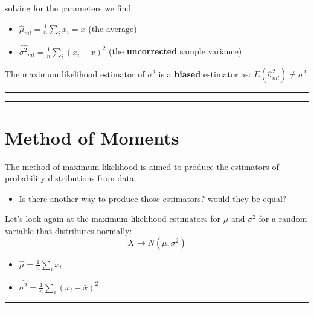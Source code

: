 \documentclass[
]{book}
\providecommand{\tightlist}{%
  \setlength{\itemsep}{0pt}\setlength{\parskip}{0pt}}
\begin{document}
solving for the parameters we find

\begin{itemize}
\tightlist
\item
  \(\hat{\mu}_{ml}=\frac{1}{n}\sum_i x_i=\bar{x}\) (the average)
\item
  \(\hat{\sigma^2}_{ml}=\frac{1}{n}\sum_i(x_i-\bar{x})^2\) (the \textbf{uncorrected} sample variance)
\end{itemize}

The maximum likelihood estimator of \(\sigma^2\) is a \textbf{biased} estimator as: \(E(\hat{\sigma}^2_{ml})\neq \sigma^2\)

\begin{center}\rule{0.5\linewidth}{0.5pt}\end{center}

\begin{center}\rule{0.5\linewidth}{0.5pt}\end{center}

\hypertarget{method-of-moments}{%
\section{Method of Moments}\label{method-of-moments}}

The method of maximum likelihood is aimed to produce the estimators of probability distributions from data.

\begin{itemize}
\tightlist
\item
  Is there another way to produce those estimators? would they be equal?
\end{itemize}

Let's look again at the maximum likelihood estimators for \(\mu\) and \(\sigma^2\) for a random variable that distributes normally: \[X \rightarrow N(\mu, \sigma^2)\]

\begin{itemize}
\tightlist
\item
  \(\hat{\mu}=\frac{1}{n}\sum_i x_i\)
\item
  \(\hat{\sigma^2}=\frac{1}{n}\sum_i(x_i-\bar{x})^2\)
\end{itemize}

\begin{center}\rule{0.5\linewidth}{0.5pt}\end{center}

\begin{center}\rule{0.5\linewidth}{0.5pt}\end{center}
\end{document}
